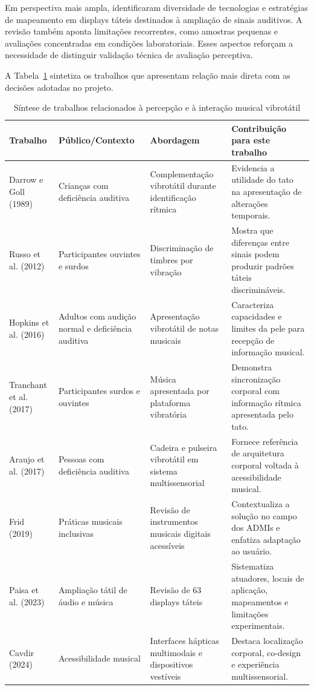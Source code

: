 Em perspectiva mais ampla, \textcite{paisa2023} identificaram diversidade de tecnologias e estratégias de mapeamento em displays táteis destinados à ampliação de sinais auditivos. A revisão também aponta limitações recorrentes, como amostras pequenas e avaliações concentradas em condições laboratoriais. Esses aspectos reforçam a necessidade de distinguir validação técnica de avaliação perceptiva.

A Tabela~\ref{tab:estado_arte} sintetiza os trabalhos que apresentam relação mais direta com as decisões adotadas no projeto.

\begin{table}[htbp]
\centering
\caption{Síntese de trabalhos relacionados à percepção e à interação musical vibrotátil}
\label{tab:estado_arte}
\small
\begin{tabular}{p{2.8cm} p{3.3cm} p{4.1cm} p{5.0cm}}
\hline
\textbf{Trabalho} & \textbf{Público/Contexto} & \textbf{Abordagem} & \textbf{Contribuição para este trabalho} \\
\hline
Darrow e Goll (1989) &
Crianças com deficiência auditiva &
Complementação vibrotátil durante identificação rítmica &
Evidencia a utilidade do tato na apresentação de alterações temporais. \\
\hline
Russo et al. (2012) &
Participantes ouvintes e surdos &
Discriminação de timbres por vibração &
Mostra que diferenças entre sinais podem produzir padrões táteis discrimináveis. \\
\hline
Hopkins et al. (2016) &
Adultos com audição normal e deficiência auditiva &
Apresentação vibrotátil de notas musicais &
Caracteriza capacidades e limites da pele para recepção de informação musical. \\
\hline
Tranchant et al. (2017) &
Participantes surdos e ouvintes &
Música apresentada por plataforma vibratória &
Demonstra sincronização corporal com informação rítmica apresentada pelo tato. \\
\hline
Araujo et al. (2017) &
Pessoas com deficiência auditiva &
Cadeira e pulseira vibrotátil em sistema multissensorial &
Fornece referência de arquitetura corporal voltada à acessibilidade musical. \\
\hline
Frid (2019) &
Práticas musicais inclusivas &
Revisão de instrumentos musicais digitais acessíveis &
Contextualiza a solução no campo dos ADMIs e enfatiza adaptação ao usuário. \\
\hline
Paisa et al. (2023) &
Ampliação tátil de áudio e música &
Revisão de 63 displays táteis &
Sistematiza atuadores, locais de aplicação, mapeamentos e limitações experimentais. \\
\hline
Cavdir (2024) &
Acessibilidade musical &
Interfaces hápticas multimodais e dispositivos vestíveis &
Destaca localização corporal, co-design e experiência multissensorial. \\
\hline
\end{tabular}
\end{table}

